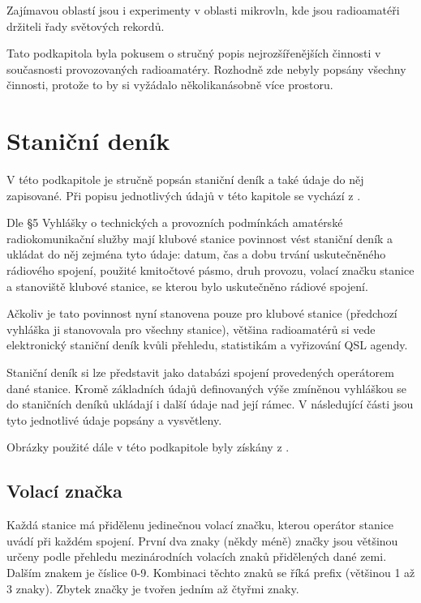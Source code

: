 Zajímavou oblastí jsou i experimenty v oblasti mikrovln, kde jsou radioamatéři
držiteli řady světových rekordů. 

Tato podkapitola byla pokusem o stručný popis nejrozšířenějších činnosti v současnosti provozovaných
radioamatéry. Rozhodně zde nebyly popsány všechny činnosti, protože to by si
vyžádalo několikanásobně více prostoru.

\section{Staniční deník}
\label{stanicni_denik}

V této podkapitole je stručně popsán staniční deník a také údaje do něj zapisované.
Při popisu jednotlivých údajů v této kapitole se vychází z \cite{pozadavky}.

Dle §5 Vyhlášky o technických a provozních podmínkách amatérské radiokomunikační služby \cite{vyhlaska}
mají klubové stanice povinnost vést staniční deník a ukládat do něj zejména tyto údaje: datum, čas a dobu trvání
uskutečněného rádiového spojení, použité kmitočtové pásmo, druh provozu,
volací značku stanice a stanoviště klubové stanice, se kterou bylo uskutečněno rádiové spojení.

Ačkoliv je tato povinnost nyní stanovena pouze pro klubové stanice (předchozí
vyhláška ji stanovovala pro všechny stanice), většina radioamatérů si vede
elektronický staniční deník kvůli přehledu, statistikám a
vyřizování QSL agendy.

Staniční deník si lze představit jako databázi spojení provedených operátorem dané stanice.
Kromě základních údajů definovaných výše zmíněnou vyhláškou se do staničních deníků ukládají i další údaje
nad její rámec. V následující části jsou tyto jednotlivé údaje popsány a vysvětleny.

Obrázky použité dále v této podkapitole byly získány z \cite{mapability}.

\subsection{Volací značka}

Každá stanice má přidělenu jedinečnou volací značku, kterou operátor stanice uvádí při každém spojení.
První dva znaky (někdy méně) značky jsou většinou určeny podle přehledu mezinárodních volacích znaků
přidělených dané zemi.
Dalším znakem je číslice 0-9. Kombinaci těchto znaků se říká prefix (většinou 1 až
3 znaky). Zbytek značky je tvořen jedním až čtyřmi znaky.

